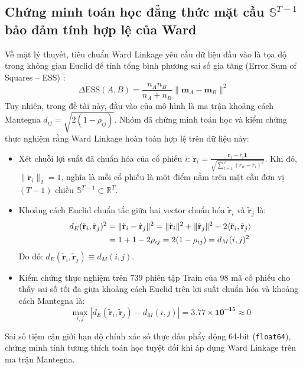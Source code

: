 \documentclass[12pt,a4paper,oneside,openany]{report}
\begin{document}
\subsection{Chứng minh toán học đẳng thức mặt cầu \texorpdfstring{$\mathbb{S}^{T-1}$}{S^(T-1)} bảo đảm tính hợp lệ của Ward}
Về mặt lý thuyết, tiêu chuẩn Ward Linkage yêu cầu dữ liệu đầu vào là tọa độ trong không gian Euclid để tính tổng bình phương sai số gia tăng (Error Sum of Squares -- ESS) \cite{ward1963}:
\begin{equation}
  \Delta \text{ESS}(A, B) = \frac{n_A n_B}{n_A + n_B} \|\mathbf{m}_A - \mathbf{m}_B\|^2
  \label{eq:ward_ess}
\end{equation}
Tuy nhiên, trong đề tài này, đầu vào của mô hình là ma trận khoảng cách Mantegna $d_{ij} = \sqrt{2(1 - \rho_{ij})}$. Nhóm đã chứng minh toán học và kiểm chứng thực nghiệm rằng Ward Linkage hoàn toàn hợp lệ trên dữ liệu này:
\begin{itemize}
  \item Xét chuỗi lợi suất đã chuẩn hóa của cổ phiếu $i$: $\tilde{\mathbf{r}}_i = \frac{\mathbf{r}_i - \bar{r}_i \mathbf{1}}{\sqrt{\sum_{t=1}^T (r_{it} - \bar{r}_i)^2}}$. Khi đó, $\|\tilde{\mathbf{r}}_i\|_2 = 1$, nghĩa là mỗi cổ phiếu là một điểm nằm trên mặt cầu đơn vị $(T-1)$ chiều $\mathbb{S}^{T-1} \subset \mathbb{R}^T$.
  \item Khoảng cách Euclid chuẩn tắc giữa hai vector chuẩn hóa $\tilde{\mathbf{r}}_i$ và $\tilde{\mathbf{r}}_j$ là:
  \begin{align}
    d_E(\tilde{\mathbf{r}}_i, \tilde{\mathbf{r}}_j)^2 
    &= \|\tilde{\mathbf{r}}_i - \tilde{\mathbf{r}}_j\|^2 = \|\tilde{\mathbf{r}}_i\|^2 + \|\tilde{\mathbf{r}}_j\|^2 - 2 \langle\tilde{\mathbf{r}}_i, \tilde{\mathbf{r}}_j\rangle \notag \\
    &= 1 + 1 - 2 \rho_{ij} = 2(1 - \rho_{ij}) = d_M(i, j)^2
  \end{align}
  Do đó: $d_E(\tilde{\mathbf{r}}_i, \tilde{\mathbf{r}}_j) \equiv d_M(i, j)$.
  \item Kiểm chứng thực nghiệm trên 739 phiên tập Train của 98 mã cổ phiếu cho thấy sai số tối đa giữa khoảng cách Euclid trên lợi suất chuẩn hóa và khoảng cách Mantegna là:
  \begin{equation}
    \max_{i, j} |d_E(\tilde{\mathbf{r}}_i, \tilde{\mathbf{r}}_j) - d_M(i, j)| = \mathbf{3.77 \times 10^{-15}} \approx 0
  \end{equation}
\end{itemize}
Sai số tiệm cận giới hạn độ chính xác số thực dấu phẩy động 64-bit (\texttt{float64}), chứng minh tính tương thích toán học tuyệt đối khi áp dụng Ward Linkage trên ma trận Mantegna.
\end{document}
